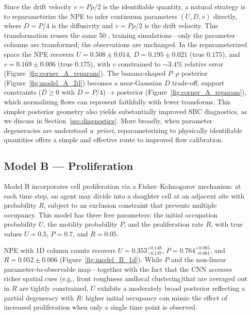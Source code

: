 \documentclass{article}
\providecommand{\DIFaddtex}[1]{{\protect\color{blue} \sf #1}} %
\providecommand{\DIFdeltex}[1]{{\protect\color{red} \scriptsize #1}} %
\providecommand{\DIFaddbegin}{} %
\providecommand{\DIFaddend}{} %
\providecommand{\DIFdelbegin}{} %
\providecommand{\DIFdelend}{} %
\providecommand{\DIFadd}[1]{\texorpdfstring{\DIFaddtex{#1}}{#1}} %
\providecommand{\DIFdel}[1]{\texorpdfstring{\DIFdeltex{#1}}{}} %
\newcommand{\DIFscaledelfig}{0.5}
\newlength{\DIFdelgraphicswidth} %
\newlength{\DIFdelgraphicsheight} %
\newcommand{\DIFaddincludegraphics}[2][]{{\color{blue}\fbox{\DIFOincludegraphics[#1]{#2}}}} %
\newcommand{\DIFdelincludegraphics}[2][]{%
\sbox{\DIFdelgraphicsbox}{\DIFOincludegraphics[#1]{#2}}%
\settoboxwidth{\DIFdelgraphicswidth}{\DIFdelgraphicsbox} %
\settoboxtotalheight{\DIFdelgraphicsheight}{\DIFdelgraphicsbox} %
\scalebox{\DIFscaledelfig}{%
\parbox[b]{\DIFdelgraphicswidth}{\usebox{\DIFdelgraphicsbox}\\[-\baselineskip] \rule{\DIFdelgraphicswidth}{0em}}\llap{\resizebox{\DIFdelgraphicswidth}{\DIFdelgraphicsheight}{%
\setlength{\unitlength}{\DIFdelgraphicswidth}%
\begin{picture}(1,1)%
\thicklines\linethickness{2pt} %
{\color[rgb]{1,0,0}\put(0,0){\framebox(1,1){}}}%
{\color[rgb]{1,0,0}\put(0,0){\line( 1,1){1}}}%
{\color[rgb]{1,0,0}\put(0,1){\line(1,-1){1}}}%
\end{picture}%
}\hspace*{3pt}}} %
} %
\DeclareRobustCommand{\DIFaddbegin}{\DIFOaddbegin \let\includegraphics\DIFaddincludegraphics} %
\DeclareRobustCommand{\DIFaddend}{\DIFOaddend \let\includegraphics\DIFOincludegraphics} %
\DeclareRobustCommand{\DIFdelbegin}{\DIFOdelbegin \let\includegraphics\DIFdelincludegraphics} %
\DeclareRobustCommand{\DIFdelend}{\DIFOaddend \let\includegraphics\DIFOincludegraphics} %
\begin{document}
\DIFadd{Since the drift velocity $v = P\rho/2$ is the identifiable quantity, a natural strategy is to reparameterize the NPE to infer continuum parameters $(U, D, v)$ directly, where $D = P/4$ is the diffusivity and $v = P\rho/2$ is the drift velocity. This transformation reuses the same 50}{\DIFadd{,}}\DIFadd{000 training simulations---only the parameter columns are transformed; the observations are unchanged. In the reparameterized space the NPE recovers $U = 0.508 \pm 0.014$, $D = 0.195 \pm 0.021$ (true $0.175$), and $v = 0.169 \pm 0.006$ (true $0.175$), with $v$ constrained to ${\sim}3.4\%$ relative error (Figure~\ref{fig:corner_A_reparam}). The banana-shaped $P$--$\rho$ posterior (Figure~\ref{fig:model_A_2d}) becomes a near-Gaussian }\DIFaddend $D$\DIFdelbegin \DIFdel{trade-off, support constraints ($D\!\ge\!0$ with $D\!=\!P/4$) }\DIFdelend \DIFaddbegin \DIFadd{--$v$ posterior (Figure~\ref{fig:corner_A_reparam}), which normalizing flows can represent faithfully with fewer transforms. This simpler posterior geometry also yields substantially improved SBC diagnostics, as we discuss in Section~\ref{sec:diagnostics}. More broadly, when parameter degeneracies are understood \emph{a~priori}, reparameterizing to physically identifiable quantities offers a simple and effective route to improved flow calibration.
}



\subsection{\DIFadd{Model B --- Proliferation}}\label{sec:model_b}

\DIFadd{Model B incorporates cell proliferation via a Fisher--Kolmogorov mechanism: at each time step, an agent may divide into a daughter cell at an adjacent site with probability $R$, subject to an exclusion constraint that prevents multiple occupancy. This model has three free parameters: the initial occupation probability $U$, the motility probability $P$, and the proliferation rate $R$, with true values $U = 0.5$}\DIFaddend , \DIFaddbegin \DIFadd{$P = 0.7$, and $R = 0.05$.
}

\DIFadd{NPE with 1D column counts recovers $U = 0.353^{+0.148}_{-0.137}$, $P = 0.764^{+0.085}_{-0.081}$, and $R = 0.052 \pm 0.006$ (Figure~\ref{fig:model_B_1d}). While $P$ }\DIFaddend and \DIFdelbegin \DIFdel{the non-linear parameter-to-observable map—together with the fact that the CNN accesses richer spatial cues (e.g., front roughness andlocal clustering)that are averaged out in }\DIFdelend \DIFaddbegin \DIFadd{$R$ are tightly constrained, $U$ exhibits a moderately broad posterior reflecting a partial degeneracy with $R$: higher initial occupancy can mimic the effect of increased proliferation when only a single time point is observed.
}
\end{document}
